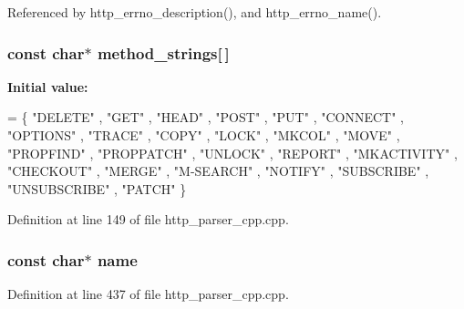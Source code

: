 Referenced by http\+\_\+errno\+\_\+description(), and http\+\_\+errno\+\_\+name().

\subsubsection[{method\+\_\+strings}]{\setlength{\rightskip}{0pt plus 5cm}const char$\ast$ method\+\_\+strings[$\,$]\hspace{0.3cm}{\ttfamily [static]}}\label{http__parser__cpp_8cpp_a5aeac132f8919dfe8217cdcdc0e8388f}
{\bfseries Initial value\+:}
\begin{DoxyCode}
=
  \{ \textcolor{stringliteral}{"DELETE"}
  , \textcolor{stringliteral}{"GET"}
  , \textcolor{stringliteral}{"HEAD"}
  , \textcolor{stringliteral}{"POST"}
  , \textcolor{stringliteral}{"PUT"}
  , \textcolor{stringliteral}{"CONNECT"}
  , \textcolor{stringliteral}{"OPTIONS"}
  , \textcolor{stringliteral}{"TRACE"}
  , \textcolor{stringliteral}{"COPY"}
  , \textcolor{stringliteral}{"LOCK"}
  , \textcolor{stringliteral}{"MKCOL"}
  , \textcolor{stringliteral}{"MOVE"}
  , \textcolor{stringliteral}{"PROPFIND"}
  , \textcolor{stringliteral}{"PROPPATCH"}
  , \textcolor{stringliteral}{"UNLOCK"}
  , \textcolor{stringliteral}{"REPORT"}
  , \textcolor{stringliteral}{"MKACTIVITY"}
  , \textcolor{stringliteral}{"CHECKOUT"}
  , \textcolor{stringliteral}{"MERGE"}
  , \textcolor{stringliteral}{"M-SEARCH"}
  , \textcolor{stringliteral}{"NOTIFY"}
  , \textcolor{stringliteral}{"SUBSCRIBE"}
  , \textcolor{stringliteral}{"UNSUBSCRIBE"}
  , \textcolor{stringliteral}{"PATCH"}
  \}
\end{DoxyCode}


Definition at line 149 of file http\+\_\+parser\+\_\+cpp.\+cpp.

\subsubsection[{name}]{\setlength{\rightskip}{0pt plus 5cm}const char$\ast$ name}\label{http__parser__cpp_8cpp_a8f8f80d37794cde9472343e4487ba3eb}


Definition at line 437 of file http\+\_\+parser\+\_\+cpp.\+cpp.

